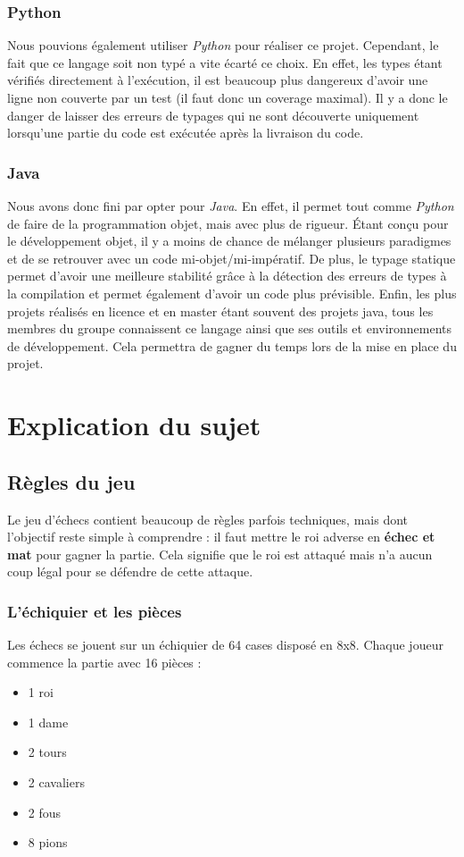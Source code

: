 \documentclass{article}
\begin{document}
\subsubsection{Python}
Nous pouvions également utiliser \textit{Python} pour réaliser ce projet. Cependant, le fait que ce langage
soit non typé a vite écarté ce choix. En effet, les types étant vérifiés directement à l'exécution, il est
beaucoup plus dangereux d'avoir une ligne non couverte par un test (il faut donc un coverage maximal). Il y
a donc le danger de laisser des erreurs de typages qui ne sont découverte uniquement lorsqu'une partie du code
est exécutée après la livraison du code.

\subsubsection{Java}
Nous avons donc fini par opter pour \textit{Java}. En effet, il permet tout comme \textit{Python} de faire
de la programmation objet, mais avec plus de rigueur. Étant conçu pour le développement objet, il y a moins
de chance de mélanger plusieurs paradigmes et de se retrouver avec un code mi-objet/mi-impératif. De plus,
le typage statique permet d'avoir une meilleure stabilité grâce à la détection des erreurs de types à la 
compilation et permet également d'avoir un code plus prévisible. Enfin, les plus projets réalisés en licence
et en master étant souvent des projets java, tous les membres du groupe connaissent ce langage ainsi que ses
outils et environnements de développement. Cela permettra de gagner du temps lors de la mise en place du projet. 

\section{Explication du sujet}
\subsection{Règles du jeu}
Le jeu d'échecs contient beaucoup de règles parfois techniques, mais dont l'objectif reste simple à comprendre :
 il faut mettre le roi adverse en \textbf{échec et mat} pour gagner la partie. Cela signifie que le roi est attaqué 
 mais n'a aucun coup légal pour se défendre de cette attaque.

\subsubsection{L'échiquier et les pièces}
Les échecs se jouent sur un échiquier de 64 cases disposé en 8x8. Chaque joueur commence la partie avec 16 pièces :
\begin{itemize}
    \item 1 roi
    \item 1 dame
    \item 2 tours
    \item 2 cavaliers
    \item 2 fous
    \item 8 pions
\end{itemize}
\end{document}
